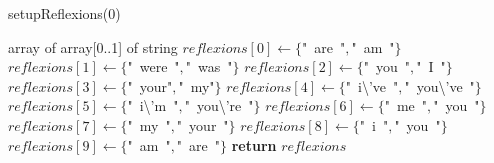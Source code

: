 \documentclass[a4paper,10pt]{article}
\begin{document}
\begin{algorithm}
\caption{setupReflexions(0)}
\begin{algorithmic}[5]
\State {}
    \State array of array[0..1] of string
  \EndDecl
  \State \(reflexions[0]\gets\{\)"{}\ are\ "{}\(,\)"{}\ am\ "{}\(\}\)
  \State \(reflexions[1]\gets\{\)"{}\ were\ "{}\(,\)"{}\ was\ "{}\(\}\)
  \State \(reflexions[2]\gets\{\)"{}\ you\ "{}\(,\)"{}\ I\ "{}\(\}\)
  \State \(reflexions[3]\gets\{\)"{}\ your"{}\(,\)"{}\ my"{}\(\}\)
  \State \(reflexions[4]\gets\{\)"{}\ i\textbackslash{}'{}ve\ "{}\(,\)"{}\ you\textbackslash{}'{}ve\ "{}\(\}\)
  \State \(reflexions[5]\gets\{\)"{}\ i\textbackslash{}'{}m\ "{}\(,\)"{}\ you\textbackslash{}'{}re\ "{}\(\}\)
  \State \(reflexions[6]\gets\{\)"{}\ me\ "{}\(,\)"{}\ you\ "{}\(\}\)
  \State \(reflexions[7]\gets\{\)"{}\ my\ "{}\(,\)"{}\ your\ "{}\(\}\)
  \State \(reflexions[8]\gets\{\)"{}\ i\ "{}\(,\)"{}\ you\ "{}\(\}\)
  \State \(reflexions[9]\gets\{\)"{}\ am\ "{}\(,\)"{}\ are\ "{}\(\}\)
  \State \textbf{return} \(reflexions\)
\EndFunction
\end{algorithmic}
\end{algorithm}
\end{document}
